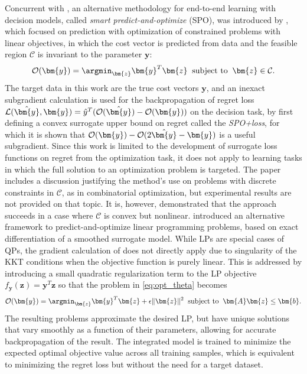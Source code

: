 Concurrent with , an alternative methodology for end-to-end learning with decision models, called \emph{smart predict-and-optimize} (SPO), was introduced by , which focused on prediction with optimization of constrained problems with linear objectives, in which the cost vector is predicted from data and the feasible region $\mathcal{C}$ is invariant to the parameter $\bm{y}$:
\begin{equation}
\label{eq:opt_spo}
\mathcal{O}(\bm{y}) = \argmin_{\bm{z}} \bm{y}^T\bm{z} \;\; 
  \text{subject to} \;\;
  \bm{z} \in \mathcal{C}.
\end{equation}
The target data in this work are the true cost vectors $\bm{y}$, and an inexact subgradient calculation is used for the backpropagation of regret loss 
$\mathcal{L}(\hat{\bm{y}}, \bm{y}) = \hat{y}^T ( {\cal O}(\hat{\bm{y}}) - {\cal O}(\bm{y})  )$  on the decision task, by first defining a convex surrogate upper bound on regret called the \emph{SPO+loss}, for which it is shown that ${\cal O}(\bm{y})-{\cal O}(2\hat{\bm{y}} - \bm{y})$ is a useful subgradient. 
Since this work is limited to the development of surrogate loss functions on regret from the optimization task, it does not apply to learning tasks in which the full solution to an optimization problem is targeted. The paper includes a discussion justifying the method's use on problems with discrete constraints in $\mathcal{C}$, as in combinatorial optimization, but experimental results are not provided on that topic. It is, however, demonstrated that the approach succeeds in a case where $\mathcal{C}$ is convex but nonlinear.  
 introduced an alternative framework to predict-and-optimize linear programming problems, based on exact differentiation of a smoothed surrogate model. While LPs are special cases of QPs, the gradient calculation of  does not directly apply due to singularity of the KKT conditions when the objective function is purely linear. This is addressed by introducing a small quadratic regularization term to the LP objective $f_{\bm{y}}(\bm{z}) = \bm{y}^T \bm{z}$ so that the problem in \eqref{eq:opt_theta} becomes
\begin{equation}
\label{eq:opt_theta_LP}
\mathcal{O}(\bm{y}) = \argmin_{\bm{z}} \bm{y}^T \bm{z} + \epsilon\|\bm{z}\|^2 \;\;
  \text{subject to} \;\;
  \bm{A}\bm{z} \leq \bm{b}.
\end{equation}
The resulting problems approximate the desired LP, but have unique solutions that vary smoothly as a function of their parameters, allowing for accurate backpropagation of the result. 
The integrated model is trained to minimize the expected optimal objective value across all training samples, which is equivalent to minimizing the regret loss but without the need for a target dataset.
